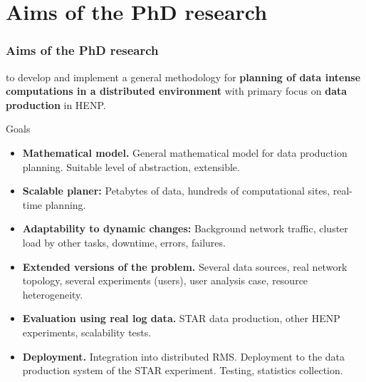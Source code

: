 \documentclass{beamer}
\begin{document}
\section{Aims of the PhD research}
\begin{frame}\frametitle{Aims of the PhD research}
\begin{footnotesize}
to develop and implement a general methodology for \textbf{planning of data intense computations in a distributed environment} with primary focus on \textbf{data production} in HENP. 
\begin{block}{Goals}
\begin{itemize}
\item \textbf{Mathematical model.} General mathematical model for data production planning. Suitable level of abstraction, extensible. 
\item \textbf{Scalable planer:} Petabytes of data, hundreds of computational sites, real-time planning.
\item \textbf{Adaptability to dynamic changes:} Background network traffic, cluster load by other tasks, downtime, errors, failures.
\item \textbf{Extended versions of the problem.} Several data sources, real network topology, several experiments (users), user analysis case, resource heterogeneity. 
\item \textbf{Evaluation using real log data.} STAR data production, other HENP experiments, scalability tests. 
\item \textbf{Deployment.} Integration into distributed RMS. Deployment to the data production system of the STAR experiment. Testing, statistics collection. 
\end{itemize}

\end{block}
\end{footnotesize}
\end{frame}

\begin{tiny}
\renewcommand*{\bibfont}{\tiny}
\printbibliography
\end{tiny}
\end{document}
